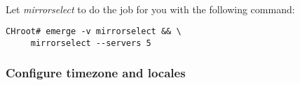 \documentclass[11pt,a4paper]{article}
\begin{document}
\begin{itemize}
                        

                        \paragraph{} Let \textit{mirrorselect} to do the job for you with the following command:

                        \begin{lstlisting}[style=BashInputCHRoot]
 CHroot# emerge -v mirrorselect && \
     mirrorselect --servers 5
                        \end{lstlisting}

                \end{itemize}

            \newpage
            \subsubsection{Configure timezone and locales}
\end{document}

